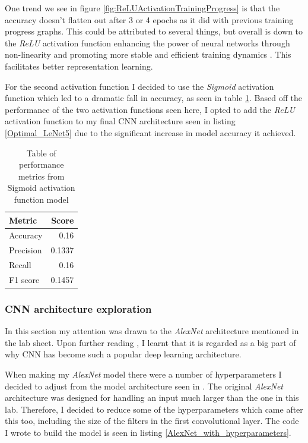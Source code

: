 \documentclass[11pt, letterpaper]{article}
\begin{document}
One trend we see in figure \ref{fig:ReLUActivationTrainingProgress} is that the accuracy doesn't flatten out after 3 or 4 epochs as it did with previous training progress graphs. This could be attributed to several things, but overall is down to the \textit{ReLU} activation function enhancing the power of neural networks through non-linearity and promoting more stable and efficient training dynamics \cite{ReLU-Brownlee}. This facilitates better representation learning. 

For the second activation function I decided to use the \textit{Sigmoid} activation function which led to a dramatic fall in accuracy, as seen in table \ref{tab:SigmoidActivationPerformanceMetrics}. Based off the performance of the two activation functions seen here, I opted to add the \textit{ReLU} activation function to my final CNN architecture seen in listing \ref{Optimal_LeNet5} due to the significant increase in model accuracy it achieved.

\begin{table}[ht]
    \begin{center}
      \caption{Table of performance metrics from Sigmoid activation function model}
      \label{tab:SigmoidActivationPerformanceMetrics}
      \begin{tabular}{l|r} %
        \textbf{Metric} & \textbf{Score}\\
        \hline
        Accuracy & 0.16\\
        Precision & 0.1337\\
        Recall & 0.16\\
        F1 score & 0.1457\\
      \end{tabular}
    \end{center}
  \end{table}

\subsubsection*{CNN architecture exploration}
In this section my attention was drawn to the \textit{AlexNet} architecture mentioned in the lab sheet. Upon further reading \cite{AlexNet, DeepLearningCNN}, I learnt that it is regarded as a big part of why CNN has become such a popular deep learning architecture.

When making my \textit{AlexNet} model there were a number of hyperparameters I decided to adjust from the model architecture seen in \cite{AlexNet}. The original \textit{AlexNet} architecture was designed for handling an input much larger than the one in this lab. Therefore, I decided to reduce some of the hyperparameters which came after this too, including the size of the filters in the first convolutional layer. The code I wrote to build the model is seen in listing \ref{AlexNet_with_hyperparameters}.
\end{document}
